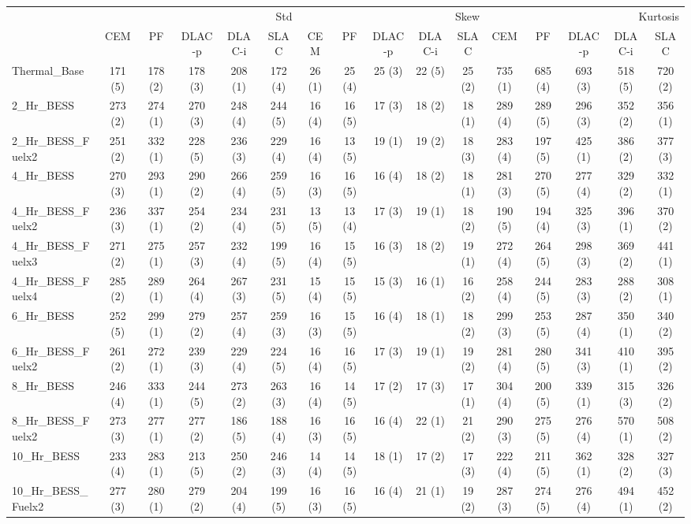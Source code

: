 \begin{tabular}{lccccccccccccccc}
\toprule
 & \multicolumn{5}{r}{Std} & \multicolumn{5}{r}{Skew} & \multicolumn{5}{r}{Kurtosis} \\
 & CEM & PF & DLAC-p & DLAC-i & SLAC & CEM & PF & DLAC-p & DLAC-i & SLAC & CEM & PF & DLAC-p & DLAC-i & SLAC \\
\midrule
Thermal_Base & 171 (5) & 178 (2) & 178 (3) & 208 (1) & 172 (4) & 26 (1) & 25 (4) & 25 (3) & 22 (5) & 25 (2) & 735 (1) & 685 (4) & 693 (3) & 518 (5) & 720 (2) \\
2_Hr_BESS & 273 (2) & 274 (1) & 270 (3) & 248 (4) & 244 (5) & 16 (4) & 16 (5) & 17 (3) & 18 (2) & 18 (1) & 289 (4) & 289 (5) & 296 (3) & 352 (2) & 356 (1) \\
2_Hr_BESS_Fuelx2 & 251 (2) & 332 (1) & 228 (5) & 236 (3) & 229 (4) & 16 (4) & 13 (5) & 19 (1) & 19 (2) & 18 (3) & 283 (4) & 197 (5) & 425 (1) & 386 (2) & 377 (3) \\
4_Hr_BESS & 270 (3) & 293 (1) & 290 (2) & 266 (4) & 259 (5) & 16 (3) & 16 (5) & 16 (4) & 18 (2) & 18 (1) & 281 (3) & 270 (5) & 277 (4) & 329 (2) & 332 (1) \\
4_Hr_BESS_Fuelx2 & 236 (3) & 337 (1) & 254 (2) & 234 (4) & 231 (5) & 13 (5) & 13 (4) & 17 (3) & 19 (1) & 18 (2) & 190 (5) & 194 (4) & 325 (3) & 396 (1) & 370 (2) \\
4_Hr_BESS_Fuelx3 & 271 (2) & 275 (1) & 257 (3) & 232 (4) & 199 (5) & 16 (4) & 15 (5) & 16 (3) & 18 (2) & 19 (1) & 272 (4) & 264 (5) & 298 (3) & 369 (2) & 441 (1) \\
4_Hr_BESS_Fuelx4 & 285 (2) & 289 (1) & 264 (4) & 267 (3) & 231 (5) & 15 (4) & 15 (5) & 15 (3) & 16 (1) & 16 (2) & 258 (4) & 244 (5) & 283 (3) & 288 (2) & 308 (1) \\
6_Hr_BESS & 252 (5) & 299 (1) & 279 (2) & 257 (4) & 259 (3) & 16 (3) & 15 (5) & 16 (4) & 18 (1) & 18 (2) & 299 (3) & 253 (5) & 287 (4) & 350 (1) & 340 (2) \\
6_Hr_BESS_Fuelx2 & 261 (2) & 272 (1) & 239 (3) & 229 (4) & 224 (5) & 16 (4) & 16 (5) & 17 (3) & 19 (1) & 19 (2) & 281 (4) & 280 (5) & 341 (3) & 410 (1) & 395 (2) \\
8_Hr_BESS & 246 (4) & 333 (1) & 244 (5) & 273 (2) & 263 (3) & 16 (4) & 14 (5) & 17 (2) & 17 (3) & 17 (1) & 304 (4) & 200 (5) & 339 (1) & 315 (3) & 326 (2) \\
8_Hr_BESS_Fuelx2 & 273 (3) & 277 (1) & 277 (2) & 186 (5) & 188 (4) & 16 (3) & 16 (5) & 16 (4) & 22 (1) & 21 (2) & 290 (3) & 275 (5) & 276 (4) & 570 (1) & 508 (2) \\
10_Hr_BESS & 233 (4) & 283 (1) & 213 (5) & 250 (2) & 246 (3) & 14 (4) & 14 (5) & 18 (1) & 17 (2) & 17 (3) & 222 (4) & 211 (5) & 362 (1) & 328 (2) & 327 (3) \\
10_Hr_BESS_Fuelx2 & 277 (3) & 280 (1) & 279 (2) & 204 (4) & 199 (5) & 16 (3) & 16 (5) & 16 (4) & 21 (1) & 19 (2) & 287 (3) & 274 (5) & 276 (4) & 494 (1) & 452 (2) \\
\bottomrule
\end{tabular}
